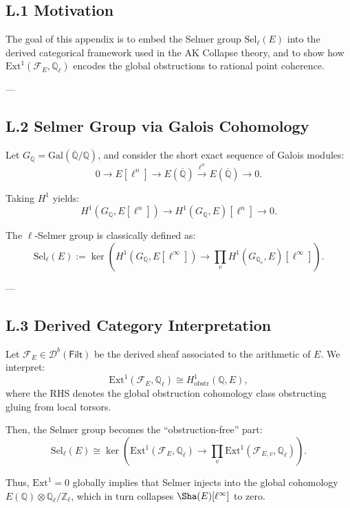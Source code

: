 \subsection*{L.1 Motivation}

The goal of this appendix is to embed the Selmer group \( \mathrm{Sel}_\ell(E) \)  
into the derived categorical framework used in the AK Collapse theory,  
and to show how \( \mathrm{Ext}^1(\mathcal{F}_E, \mathbb{Q}_\ell) \) encodes the global obstructions to rational point coherence.

---

\subsection*{L.2 Selmer Group via Galois Cohomology}

Let \( G_\mathbb{Q} = \mathrm{Gal}(\overline{\mathbb{Q}}/\mathbb{Q}) \), and consider the short exact sequence of Galois modules:
\[
0 \longrightarrow E[\ell^n] \longrightarrow E(\overline{\mathbb{Q}}) \xrightarrow{\ell^n} E(\overline{\mathbb{Q}}) \longrightarrow 0.
\]

Taking \( H^1 \) yields:
\[
H^1(G_\mathbb{Q}, E[\ell^n]) \longrightarrow H^1(G_\mathbb{Q}, E)[\ell^n] \longrightarrow 0.
\]

The \( \ell \)-Selmer group is classically defined as:
\[
\mathrm{Sel}_\ell(E) := \ker\left(H^1(G_\mathbb{Q}, E[\ell^\infty]) \to \prod_v H^1(G_{\mathbb{Q}_v}, E)[\ell^\infty] \right).
\]

---

\subsection*{L.3 Derived Category Interpretation}

Let \( \mathcal{F}_E \in \mathcal{D}^b(\mathsf{Filt}) \) be the derived sheaf associated to the arithmetic of \( E \).  
We interpret:
\[
\mathrm{Ext}^1(\mathcal{F}_E, \mathbb{Q}_\ell) \cong H^1_{\mathrm{obstr}}(\mathbb{Q}, E),
\]
where the RHS denotes the global obstruction cohomology class obstructing gluing from local torsors.

Then, the Selmer group becomes the “obstruction-free” part:
\[
\mathrm{Sel}_\ell(E) \cong \ker\left(\mathrm{Ext}^1(\mathcal{F}_E, \mathbb{Q}_\ell) \to \prod_v \mathrm{Ext}^1(\mathcal{F}_{E,v}, \mathbb{Q}_\ell)\right).
\]

Thus, \( \mathrm{Ext}^1 = 0 \) globally implies that Selmer injects into the global cohomology \( E(\mathbb{Q}) \otimes \mathbb{Q}_\ell/\mathbb{Z}_\ell \),  
which in turn collapses \( \Sha(E)[\ell^\infty] \) to zero.

